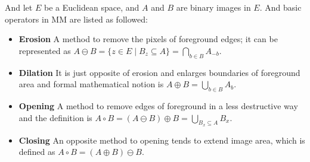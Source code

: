 And let $ E $ be a Euclidean space, and $ A $ and $ B $ are binary images in $ E $. And basic operators in MM are listed as followed:
\begin{itemize}
	\item \textbf{Erosion} A method to remove the pixels of foreground edges; it can be represented as $ A \ominus B = \{z \in E \mid B_z \subseteq A\} = \displaystyle \bigcap_{b \in B}^{}A_{-b} $.
	\item \textbf{Dilation} It is just opposite of erosion and enlarges boundaries of foreground area and formal mathematical notion is $ A\oplus B=\bigcup_{b\in B}^{} A_b $.
	\item \textbf{Opening} A method to remove edges of foreground in a less destructive way and the definition is $ A \circ B = (A \ominus B) \oplus B = \displaystyle \bigcup_{B_x\subseteq A}^{} B_x $.
	\item \textbf{Closing} An opposite method to opening tends to extend image area, which is defined as $ A \circ B = (A \oplus B) \ominus B $.
\end{itemize}